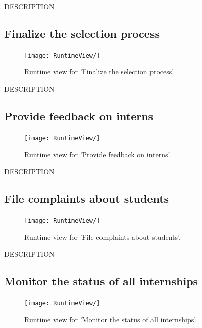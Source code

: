 DESCRIPTION


\subsection{Finalize the selection process}
\begin{figure}[H]
    \begin{center}
        \texttt{[image: RuntimeView/]}
        \caption{Runtime view for 'Finalize the selection process'.}
        \label{fig:runtime_modifybadge}%
    \end{center}
\end{figure}

DESCRIPTION


\subsection{Provide feedback on interns}
\begin{figure}[H]
    \begin{center}
        \texttt{[image: RuntimeView/]}
        \caption{Runtime view for 'Provide feedback on interns'.}
        \label{fig:runtime_modifybadge}%
    \end{center}
\end{figure}

DESCRIPTION


\subsection{File complaints about students}
\begin{figure}[H]
    \begin{center}
        \texttt{[image: RuntimeView/]}
        \caption{Runtime view for 'File complaints about students'.}
        \label{fig:runtime_modifybadge}%
    \end{center}
\end{figure}

DESCRIPTION


\subsection{Monitor the status of all internships}
\begin{figure}[H]
    \begin{center}
        \texttt{[image: RuntimeView/]}
        \caption{Runtime view for 'Monitor the status of all internships'.}
        \label{fig:runtime_modifybadge}%
    \end{center}
\end{figure}

